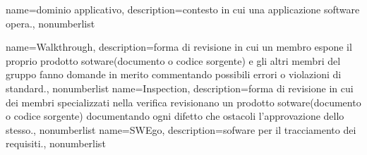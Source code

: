 {
	name={dominio applicativo},
	description={contesto in cui una applicazione software opera.}, 
	nonumberlist 
}

{
	name={Walkthrough},
	description={forma di revisione in cui un membro espone il proprio prodotto sotware(documento o codice sorgente) e gli altri membri del gruppo fanno domande in merito commentando possibili errori o violazioni di standard.}, 
	nonumberlist 
}
{
	name={Inspection},
	description={forma di revisione in cui dei membri specializzati nella verifica revisionano un prodotto sotware(documento o codice sorgente) documentando ogni difetto che ostacoli l'approvazione dello stesso.}, 
	nonumberlist 
}
{
	name={SWEgo},
	description={sofware per il tracciamento dei requisiti.}, 
	nonumberlist 
}